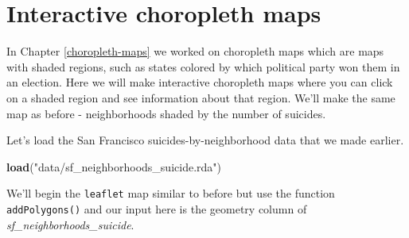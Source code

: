 \documentclass[
  12pt,
]{book}
\newenvironment{Shaded}{\begin{snugshade}}{\end{snugshade}}
\newcommand{\CommentTok}[1]{\textcolor[rgb]{0.37,0.37,0.37}{\textit{#1}}}
\newcommand{\DataTypeTok}[1]{\textcolor[rgb]{0.27,0.27,0.27}{#1}}
\newcommand{\KeywordTok}[1]{\textcolor[rgb]{0.27,0.27,0.27}{\textbf{#1}}}
\newcommand{\NormalTok}[1]{#1}
\newcommand{\OperatorTok}[1]{\textcolor[rgb]{0.43,0.43,0.43}{\textbf{#1}}}
\newcommand{\StringTok}[1]{\textcolor[rgb]{0.5,0.5,0.5}{#1}}
\begin{document}
\hypertarget{interactive-choropleth-maps}{%
\section{Interactive choropleth maps}\label{interactive-choropleth-maps}}

In Chapter \ref{choropleth-maps} we worked on choropleth maps which are maps with shaded regions, such as states colored by which political party won them in an election. Here we will make interactive choropleth maps where you can click on a shaded region and see information about that region. We'll make the same map as before - neighborhoods shaded by the number of suicides.

Let's load the San Francisco suicides-by-neighborhood data that we made earlier.

\begin{Shaded}
\begin{Highlighting}[]
\KeywordTok{load}\NormalTok{(}\StringTok{"data/sf\_neighborhoods\_suicide.rda"}\NormalTok{)}
\end{Highlighting}
\end{Shaded}

We'll begin the \texttt{leaflet} map similar to before but use the function \texttt{addPolygons()} and our input here is the geometry column of \emph{sf\_neighborhoods\_suicide}.

\begin{Shaded}
\end{Shaded}
\end{document}
